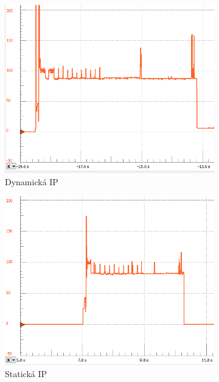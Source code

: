 \documentclass[a4paper, 12pt]{report}
\begin{document}
    \begin{figure}[h!]
        \centering
        \begin{subfigure}[b]{0.4\linewidth}
            \includegraphics[width=\linewidth]{images/ESP8266_network_dynamic_specific}
            \caption{Dynamická IP}
        \end{subfigure}
        \begin{subfigure}[b]{0.4\linewidth}
            \includegraphics[width=\linewidth]{images/ESP8266_network_static}
            \caption{Statická IP}
        \end{subfigure}
        \begin{subfigure}[b]{0.4\linewidth}

\end{subfigure}
\end{figure}
\end{document}
